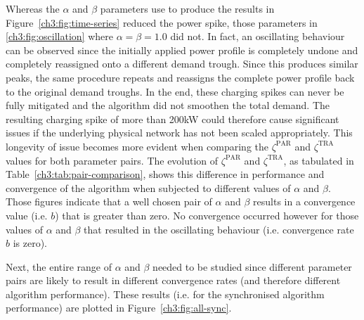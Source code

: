

Whereas the $\alpha$ and $\beta$ parameters use to produce the results in Figure~\ref{ch3:fig:time-series} reduced the power spike, those parameters in \ref{ch3:fig:oscillation} where $\alpha = \beta = 1.0$ did not.
In fact, an oscillating behaviour can be observed since the initially applied power profile is completely undone and completely reassigned onto a different demand trough.
Since this produces similar peaks, the same procedure repeats and reassigns the complete power profile back to the original demand troughs.
In the end, these charging spikes can never be fully mitigated and the algorithm did not smoothen the total demand.
The resulting charging spike of more than 200kW could therefore cause significant issues if the underlying physical network has not been scaled appropriately.
This longevity of issue becomes more evident when comparing the $\zeta^\text{PAR}$ and $\zeta^\text{TRA}$ values for both parameter pairs.
The evolution of $\zeta^\text{PAR}$ and $\zeta^\text{TRA}$, as tabulated in Table~\ref{ch3:tab:pair-comparison}, shows this difference in performance and convergence of the algorithm when subjected to different values of $\alpha$ and $\beta$.
Those figures indicate that a well chosen pair of $\alpha$ and $\beta$ results in a convergence value (i.e. $b$) that is greater than zero.
No convergence occurred however for those values of $\alpha$ and $\beta$ that resulted in the oscillating behaviour (i.e. convergence rate $b$ is zero).

Next, the entire range of $\alpha$ and $\beta$ needed to be studied since different parameter pairs are likely to result in different convergence rates (and therefore different algorithm performance).
These results (i.e. for the synchronised algorithm performance) are plotted in Figure~\ref{ch3:fig:all-sync}.



